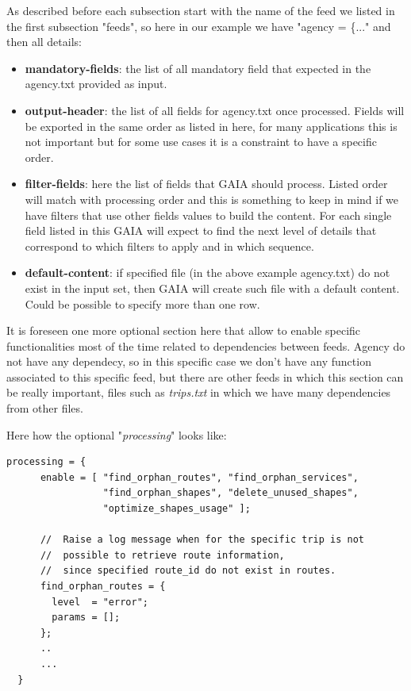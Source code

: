 \documentclass[12pt, a4paper]{book}
\begin{document}
\newpage
\begin{justify}
As described before each subsection start with the name of the feed we listed in the first subsection "feeds", so here in our example we have "agency = \{..." and then all details:
\begin{itemize}
\item \textbf{mandatory-fields}: the list of all mandatory field that expected in the agency.txt provided as input.
\item \textbf{output-header}: the list of all fields for agency.txt once processed. Fields will be exported in the same order as listed in here, for many applications this is not important but for some use cases it is a constraint to have a specific order.
\item \textbf{filter-fields}: here the list of fields that GAIA should process. Listed order will match with processing order and this is something to keep in mind if we have filters that use other fields values to build the content. For each single field listed in this GAIA will expect to find the next level of details that correspond to which filters to apply and in which sequence.
\item \textbf{default-content}: if specified file (in the above example agency.txt) do not exist in the input set, then GAIA will create such file with a default content. Could be possible to specify more than one row.
\end{itemize}

It is foreseen one more optional section here that allow to enable specific functionalities most of the time related to dependencies between feeds. Agency do not have any dependecy, so in this specific case we don't have any function associated to this specific feed, but there are other feeds in which this section can be really important, files such as \textit{trips.txt} in which we have many dependencies from other files.

Here how the optional "\textit{processing}" looks like:

\begin{small}
\begin{lstlisting}[backgroundcolor=\color{gray},frame=single]
  processing = {
      enable = [ "find_orphan_routes", "find_orphan_services",
                 "find_orphan_shapes", "delete_unused_shapes", 
                 "optimize_shapes_usage" ];
    
      //  Raise a log message when for the specific trip is not 
      //  possible to retrieve route information, 
      //  since specified route_id do not exist in routes.
      find_orphan_routes = {
        level  = "error";
        params = [];
      };
      ..
      ...
  } 
\end{lstlisting}
\end{small}


\end{justify}
\end{document}
